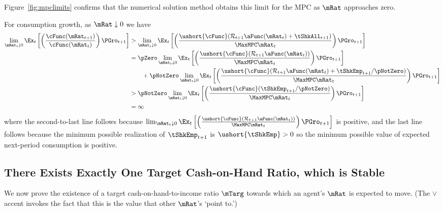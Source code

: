 \documentclass[BufferStockTheory]{subfiles}
\begin{document}
Figure~\ref{fig:mpclimits} confirms that the numerical solution method
obtains this limit for the MPC as $\mRat$ approaches zero.

For consumption growth, as $\mRat \downarrow 0$ we have
\begin{align*}
  \lim_{\mRat_{t} \downarrow 0} \Ex_{t}\left[\left(\frac{\cFunc({\mRat}_{t+1})}{\cFunc(\mRat_t)}\right){\PGro}_{t+1}\right]
  & > \lim_{\mRat_{t} \downarrow 0} \Ex_{t}\left[\left(\frac{\ushort{\cFunc}({\mathcal{\mathcal{R}}}_{t+1}\aFunc(\mRat_{t})+{%
    \tShkAll}_{t+1})}{\MaxMPC \mRat_{t}}\right){\PGro}_{t+1}\right]  \notag \\
  & = \pZero \lim_{\mRat_{t} \downarrow 0} \Ex_{t}\left[\left(\frac{\ushort{\cFunc}({\mathcal{\mathcal{R}}}_{t+1}\aFunc(\mRat_{t}))}{\MaxMPC \mRat_{t}}\right){\PGro}_{t+1}\right] \\
  & ~~~~~~ + \pNotZero \lim_{\mRat_{t} \downarrow 0}  \Ex_{t}\left[\left(\frac{\ushort{\cFunc}({\mathcal{\mathcal{R}}}_{t+1}\aFunc(\mRat_{t})+
    \tShkEmp_{t+1}/\pNotZero)}{\MaxMPC \mRat_{t}}\right){\PGro}_{t+1}\right]  \\\notag
  & > \pNotZero \lim_{\mRat_{t} \downarrow 0} \Ex_{t}\left[\left(\frac{\ushort{\cFunc}(
    \tShkEmp_{t+1}/\pNotZero)}{\MaxMPC \mRat_{t}}\right){\PGro}_{t+1}\right] \\
  & = \infty \nonumber
\end{align*}
where the second-to-last line follows because  $\lim_{\mRat_{t} \downarrow 0} \Ex_{t}\left[\left(\frac{\ushort{\cFunc}({\mathcal{\mathcal{R}}}_{t+1}\aFunc(\mRat_{t}))}{\MaxMPC \mRat_{t}}\right){\PGro}_{t+1}\right]$ is positive, and the last line follows because the minimum possible realization of $\tShkEmp_{t+1}$ is $\ushort{\tShkEmp}>0$ so the minimum possible value of expected next-period consumption is positive.

\hypertarget{onetarget}{}

\subsection{There Exists Exactly One Target Cash-on-Hand Ratio,
  which is Stable}

\label{subsec:onetarget}
\hypertarget{TheoremTarget}{}

We now prove the existence of a target cash-on-hand-to-income ratio $\mTarg$ towards which an agent's $\mRat$ is expected to move. (The $\vee$ accent invokes the fact that this is the value that other $\mRat$'s `point to.') 
\end{document}
